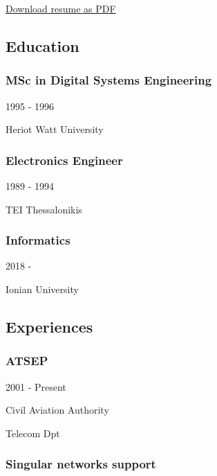 \documentclass[english,]{article}
\begin{document}
\href{pdf/cv.pdf}{Download resume as PDF}

\hypertarget{education}{%
\subsection{\texorpdfstring{{ \emph{} \emph{} }
Education}{    Education}}\label{education}}

\hypertarget{msc-in-digital-systems-engineering}{%
\subsubsection{MSc in Digital Systems
Engineering}\label{msc-in-digital-systems-engineering}}

1995 - 1996

Heriot Watt University

\hypertarget{electronics-engineer}{%
\subsubsection{Electronics Engineer}\label{electronics-engineer}}

1989 - 1994

TEI Thessalonikis

\hypertarget{informatics}{%
\subsubsection{Informatics}\label{informatics}}

2018 -

Ionian University

\hypertarget{experiences}{%
\subsection{\texorpdfstring{{ \emph{} \emph{} }
Experiences}{    Experiences}}\label{experiences}}

\hypertarget{atsep}{%
\subsubsection{ATSEP}\label{atsep}}

2001 - Present

Civil Aviation Authority

Telecom Dpt

\hypertarget{singular-networks-support}{%
\subsubsection{Singular networks
support}\label{singular-networks-support}}
\end{document}
